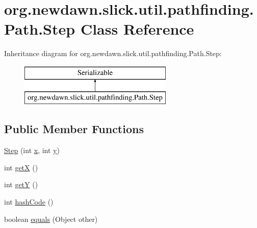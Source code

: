 \hypertarget{classorg_1_1newdawn_1_1slick_1_1util_1_1pathfinding_1_1_path_1_1_step}{}\section{org.\+newdawn.\+slick.\+util.\+pathfinding.\+Path.\+Step Class Reference}
\label{classorg_1_1newdawn_1_1slick_1_1util_1_1pathfinding_1_1_path_1_1_step}
Inheritance diagram for org.\+newdawn.\+slick.\+util.\+pathfinding.\+Path.\+Step\+:\begin{figure}[H]
\begin{center}
\leavevmode
\includegraphics[height=2.000000cm]{classorg_1_1newdawn_1_1slick_1_1util_1_1pathfinding_1_1_path_1_1_step}
\end{center}
\end{figure}
\subsection*{Public Member Functions}
\begin{DoxyCompactItemize}
\item 
\mbox{\hyperlink{classorg_1_1newdawn_1_1slick_1_1util_1_1pathfinding_1_1_path_1_1_step_ab0228967bede7207738a1e95a9cdc183}{Step}} (int \mbox{\hyperlink{classorg_1_1newdawn_1_1slick_1_1util_1_1pathfinding_1_1_path_1_1_step_a6764404c2d713db22efbeb2ec33cbdc1}{x}}, int \mbox{\hyperlink{classorg_1_1newdawn_1_1slick_1_1util_1_1pathfinding_1_1_path_1_1_step_ae77364516b69d2b5ed5ed550413c05e9}{y}})
\item 
int \mbox{\hyperlink{classorg_1_1newdawn_1_1slick_1_1util_1_1pathfinding_1_1_path_1_1_step_a1a51a84b0a5acd6bc49de69d67f87356}{getX}} ()
\item 
int \mbox{\hyperlink{classorg_1_1newdawn_1_1slick_1_1util_1_1pathfinding_1_1_path_1_1_step_af44029ddf6437f4f8cd2627f71492d2d}{getY}} ()
\item 
int \mbox{\hyperlink{classorg_1_1newdawn_1_1slick_1_1util_1_1pathfinding_1_1_path_1_1_step_ab074c861e710aac6fd7c6a831aaf9ad7}{hash\+Code}} ()
\item 
boolean \mbox{\hyperlink{classorg_1_1newdawn_1_1slick_1_1util_1_1pathfinding_1_1_path_1_1_step_ad767acab38daf546a3b32b003aa6170b}{equals}} (Object other)
\end{DoxyCompactItemize}

